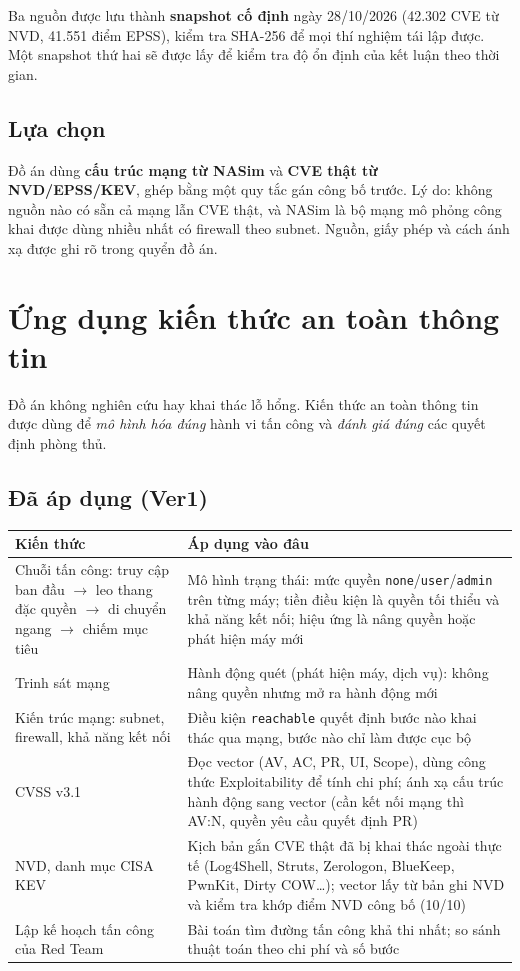\documentclass[11pt,a4paper]{article}
\begin{document}
Ba nguồn được lưu thành \textbf{snapshot cố định} ngày 28/10/2026 (42.302 CVE từ NVD, 41.551 điểm EPSS), kiểm tra SHA-256 để mọi thí nghiệm tái lập được. Một snapshot thứ hai sẽ được lấy để kiểm tra độ ổn định của kết luận theo thời gian.

\subsection{Lựa chọn}

Đồ án dùng \textbf{cấu trúc mạng từ NASim} và \textbf{CVE thật từ NVD/EPSS/KEV}, ghép bằng một quy tắc gán công bố trước. Lý do: không nguồn nào có sẵn cả mạng lẫn CVE thật, và NASim là bộ mạng mô phỏng công khai được dùng nhiều nhất có firewall theo subnet. Nguồn, giấy phép và cách ánh xạ được ghi rõ trong quyển đồ án.

\section{Ứng dụng kiến thức an toàn thông tin}

Đồ án không nghiên cứu hay khai thác lỗ hổng. Kiến thức an toàn thông tin được dùng để \emph{mô hình hóa đúng} hành vi tấn công và \emph{đánh giá đúng} các quyết định phòng thủ.

\subsection{Đã áp dụng (Ver1)}

\begin{center}
\small
\begin{tabular}{@{}Y{4.6cm}Y{11.4cm}@{}}
\toprule
\textbf{Kiến thức} & \textbf{Áp dụng vào đâu} \\
\midrule
Chuỗi tấn công: truy cập ban đầu $\to$ leo thang đặc quyền $\to$ di chuyển ngang $\to$ chiếm mục tiêu & Mô hình trạng thái: mức quyền \texttt{none}/\texttt{user}/\texttt{admin} trên từng máy; tiền điều kiện là quyền tối thiểu và khả năng kết nối; hiệu ứng là nâng quyền hoặc phát hiện máy mới \\
Trinh sát mạng & Hành động quét (phát hiện máy, dịch vụ): không nâng quyền nhưng mở ra hành động mới \\
Kiến trúc mạng: subnet, firewall, khả năng kết nối & Điều kiện \texttt{reachable} quyết định bước nào khai thác qua mạng, bước nào chỉ làm được cục bộ \\
CVSS v3.1 & Đọc vector (AV, AC, PR, UI, Scope), dùng công thức Exploitability để tính chi phí; ánh xạ cấu trúc hành động sang vector (cần kết nối mạng thì AV:N, quyền yêu cầu quyết định PR) \\
NVD, danh mục CISA KEV & Kịch bản gắn CVE thật đã bị khai thác ngoài thực tế (Log4Shell, Struts, Zerologon, BlueKeep, PwnKit, Dirty COW\ldots); vector lấy từ bản ghi NVD và kiểm tra khớp điểm NVD công bố (10/10) \\
Lập kế hoạch tấn công của Red Team & Bài toán tìm đường tấn công khả thi nhất; so sánh thuật toán theo chi phí và số bước \\
\bottomrule
\end{tabular}
\end{center}
\end{document}
